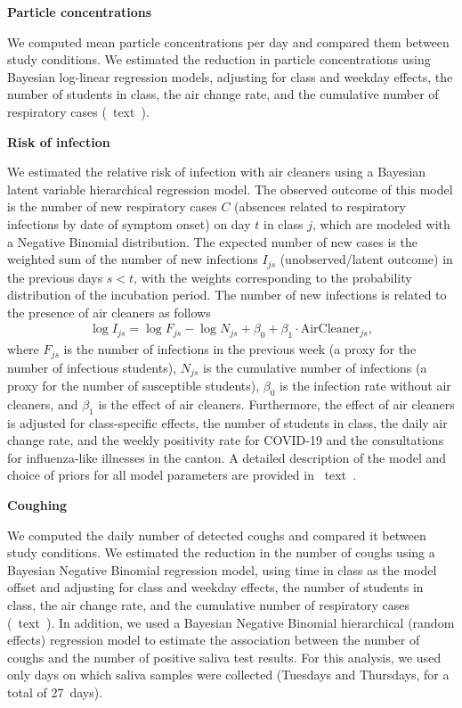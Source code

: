 \documentclass[fleqn,11pt]{wlscirep}
\begin{document}
\noindent\textbf{Particle concentrations} \smallskip

\noindent We computed mean particle concentrations per day and compared them between study conditions. We estimated the reduction in particle concentrations using Bayesian log-linear regression models, adjusting for class and weekday effects, the number of students in class, the air change rate, and the cumulative number of respiratory cases (\supp~text~). \medskip

\noindent\textbf{Risk of infection} \smallskip

\noindent We estimated the relative risk of infection with air cleaners using a Bayesian latent variable hierarchical regression model. The observed outcome of this model is the number of new respiratory cases $C$ (absences related to respiratory infections by date of symptom onset) on day $t$ in class $j$, which are modeled with a Negative Binomial distribution. The expected number of new cases is the weighted sum of the number of new infections $I_{js}$ (unobserved/latent outcome) in the previous days $s<t$, with the weights corresponding to the probability distribution of the incubation period. The number of new infections is related to the presence of air cleaners as follows
\begin{align}
    \log I_{js} = \log F_{js} - \log N_{js} + \beta_0 + \beta_1 \cdot \text{AirCleaner}_{js},
\end{align}
where $F_{js}$ is the number of infections in the previous week (a proxy for the number of infectious students), $N_{js}$ is the cumulative number of infections (a proxy for the number of susceptible students), $\beta_0$ is the infection rate without air cleaners, and $\beta_1$ is the effect of air cleaners. Furthermore, the effect of air cleaners is adjusted for class-specific effects, the number of students in class, the daily air change rate, and the weekly positivity rate for COVID-19 and the consultations for influenza-like illnesses in the canton. A detailed description of the model and choice of priors for all model parameters are provided in \supp~text~. \medskip

\noindent\textbf{Coughing} \smallskip

\noindent We computed the daily number of detected coughs and compared it between study conditions. We estimated the reduction in the number of coughs using a Bayesian Negative Binomial regression model, using time in class as the model offset and adjusting for class and weekday effects, the number of students in class, the air change rate, and the cumulative number of respiratory cases (\supp~text~). In addition, we used a Bayesian Negative Binomial hierarchical (random effects) regression model to estimate the association between the number of coughs and the number of positive saliva test results. For this analysis, we used only days on which saliva samples were collected (Tuesdays and Thursdays, for a total of 27~days).  \medskip
\end{document}
